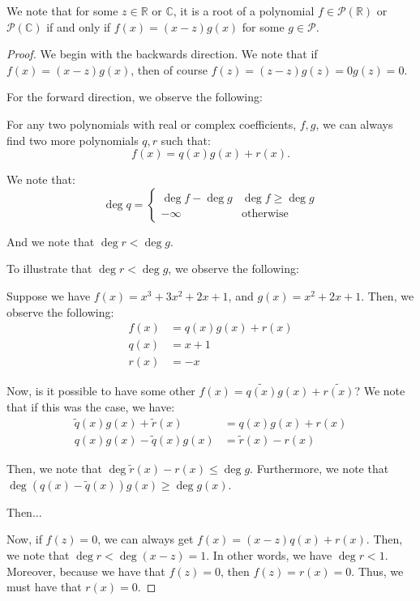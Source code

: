 \documentclass[openany]{book}
\newcommand{\CC}{\mathbb{C}}
\newcommand{\RR}{\mathbb{R}}
\begin{document}
\begin{rmk}
	We note that for some $z \in \RR$ or $\CC$, it is a root of a polynomial $f \in \mathscr{P}(\RR)$ or $\mathscr{P}(\CC)$ if and only if $f(x) = (x-z)g(x)$ for some $g \in \mathscr{P}$.
\end{rmk}
\begin{proof}
	We begin with the backwards direction. We note that if $f(x) = (x-z)g(x)$, then of course $f(z) = (z-z)g(z) = 0g(z) = 0$.
	
	For the forward direction, we observe the following:
	
	\begin{thm}
		For any two polynomials with real or complex coefficients, $f,g$, we can always find two more polynomials $q,r$ such that:
	\begin{equation*}
		f(x) = q(x)g(x) + r(x).
	\end{equation*}
	\end{thm}
	We note that:
	\begin{equation*}
		\deg q =
		\begin{cases}
			\deg f - \deg g & \deg f \geq \deg g \\
			-\infty & \text{otherwise}
		\end{cases}
	\end{equation*}

	And we note that $\deg r < \deg g$.
	\begin{example}
		To illustrate that $\deg r < \deg g$, we observe the following:
		
		Suppose we have $f(x) = x^{3} + 3x^{2} + 2x + 1$, and $g(x) = x^{2} + 2x + 1$. Then, we observe the following:
		\begin{align*}
			f(x) &= q(x) g(x) + r(x) \\
			q(x) &= x+1 \\
			r(x) &= -x
		\end{align*}
	
		Now, is it possible to have some other $f(x) = \tilde{q(x)}g(x) + \tilde{r(x)}$? We note that if this was the case, we have:
		\begin{align*}
			\tilde{q}(x)g(x) + \tilde{r}(x) &= q(x)g(x) + r(x) \\
			q(x)g(x) - \tilde{q}(x)g(x) &= \tilde{r}(x) - r(x)
		\end{align*}
	
		Then, we note that $\deg \tilde{r}(x) - r(x) \leq \deg g$. Furthermore, we note that $\deg(q(x) - \tilde{q}(x)) g(x) \geq \deg g(x) $.
		
		Then...
	\end{example}

	Now, if $f(z) = 0$, we can always get $f(x) = (x-z)q(x) + r(x)$. Then, we note that $\deg r < \deg (x-z) = 1$. In other words, we have $\deg r < 1$. Moreover, because we have that $f(z) = 0$, then $f(z) = r(x) = 0$. Thus, we must have that $r(x) = 0$.
\end{proof}
\end{document}
